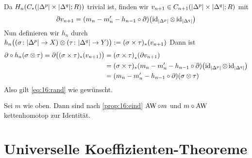 \begin{beweis}
	Da $H_n \enbrace*{C_* \enbrace*{\abs*{\Delta^p} \times \abs*{\Delta^q};R} }$ trivial ist, finden wir $v_{n+1} \in C_{n+1} \enbrace*{\abs*{\Delta^p} \times \abs*{\Delta^q};R}$ mit 
	\[
		\partial v_{n+1} = \enbrace*{m_n -m_n' - h_{n-1} \circ \partial} \enbrace*{\id_{\abs*{\Delta^p}} \otimes \id_{\abs*{\Delta^q} }}
	\]
	Nun definieren wir $h_n$ durch
	\(
		h_n \enbrace[\big]{\enbrace*{\sigma \colon \abs*{\Delta^p} \to X } \otimes  \enbrace*{\tau \colon \abs*{\Delta^q} \to Y}} := (\sigma \times \tau)_* \enbrace*{v_{n+1}}
	\)
	Dann ist
	\begin{align}
		\partial \circ h_n(\sigma \otimes \tau) = \partial \enbrace[\big]{(\sigma \times \tau)_*(v_{n+1})} &= \enbrace*{\sigma \times \tau}_* \enbrace*{\partial v_{n+1}}\\
		&=(\sigma \times \tau)_* \enbrace*{m_n -m'_n - h_{n-1} \circ \partial}\enbrace*{\id_{\abs*{\Delta^p}} \otimes \id_{\abs*{\Delta^q} }} \\
		&= \enbrace*{m_n - m'_n - h_{n-1} \circ \partial} \enbrace*{\sigma \otimes \tau}
	\end{align}
	Also gilt \eqref{eq:16:rand} wie gewünscht.
\end{beweis}
\begin{beweis}[{name={von Eilenberg-Zilber, \ref{eilenbergzilber}}}]
	Sei $m$ wie oben.
	Dann sind nach \autoref{prop:16:eind} $\operatorname{AW} \circ m$ und $m \circ \operatorname{AW}$ kettenhomotop zur Identität.
\end{beweis}
\newpage

\section{Universelle Koeffizienten-Theoreme} %
\label{sec:17}

